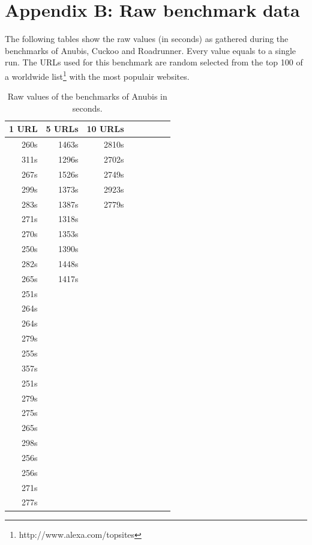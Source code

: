 \documentclass{scrartcl}
\begin{document}
\clearpage

\section*{Appendix B: Raw benchmark data}

The following tables show the raw values (in seconds) as gathered during the benchmarks of Anubis, Cuckoo and Roadrunner. Every value equals to a single run. The URLs used for this benchmark are random selected from the top 100 of a worldwide list\footnote{http://www.alexa.com/topsites} with the most populair websites.

\begin{table}[h]
\center
\begin{tabular}{@{}llllllll@{}}
\toprule
1 URL       & 5 URLs      & 10 URLs    \\ \midrule
\multicolumn{1}{r}{260s} & \multicolumn{1}{r}{1463s} & \multicolumn{1}{r}{2810s} \\
\multicolumn{1}{r}{311s} & \multicolumn{1}{r}{1296s} & \multicolumn{1}{r}{2702s} \\
\multicolumn{1}{r}{267s} & \multicolumn{1}{r}{1526s} & \multicolumn{1}{r}{2749s} \\
\multicolumn{1}{r}{299s} & \multicolumn{1}{r}{1373s} & \multicolumn{1}{r}{2923s} \\
\multicolumn{1}{r}{283s} & \multicolumn{1}{r}{1387s} & \multicolumn{1}{r}{2779s} \\
\multicolumn{1}{r}{271s} & \multicolumn{1}{r}{1318s} & \\
\multicolumn{1}{r}{270s} & \multicolumn{1}{r}{1353s} & \\
\multicolumn{1}{r}{250s} & \multicolumn{1}{r}{1390s} & \\
\multicolumn{1}{r}{282s} & \multicolumn{1}{r}{1448s} & \\
\multicolumn{1}{r}{265s} & \multicolumn{1}{r}{1417s} & \\
\multicolumn{1}{r}{251s} &  & \\
\multicolumn{1}{r}{264s} &  & \\
\multicolumn{1}{r}{264s} &  & \\
\multicolumn{1}{r}{279s} &  & \\
\multicolumn{1}{r}{255s} &  & \\
\multicolumn{1}{r}{357s} &  & \\
\multicolumn{1}{r}{251s} &  & \\
\multicolumn{1}{r}{279s} &  & \\
\multicolumn{1}{r}{275s} &  & \\
\multicolumn{1}{r}{265s} &  & \\
\multicolumn{1}{r}{298s} &  & \\
\multicolumn{1}{r}{256s} &  & \\
\multicolumn{1}{r}{256s} &  & \\
\multicolumn{1}{r}{271s} &  & \\
\multicolumn{1}{r}{277s} &  & \\ \bottomrule
\end{tabular}
\caption{Raw values of the benchmarks of Anubis in seconds.}
\label{rawdata_an}
\end{table}
\end{document}

